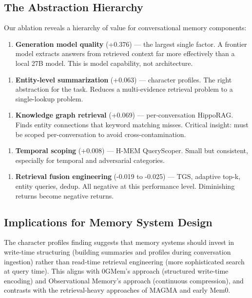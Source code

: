 \documentclass[11pt]{article}
\begin{document}
\subsection{The Abstraction Hierarchy}

Our ablation reveals a hierarchy of value for conversational memory components:


\begin{enumerate}
  \item \textbf{Generation model quality} (+0.376) --- the largest single factor. A frontier model extracts answers from retrieved context far more effectively than a local 27B model. This is model capability, not architecture.
\end{enumerate}


\begin{enumerate}
  \item \textbf{Entity-level summarization} (+0.063) --- character profiles. The right abstraction for the task. Reduces a multi-evidence retrieval problem to a single-lookup problem.
\end{enumerate}


\begin{enumerate}
  \item \textbf{Knowledge graph retrieval} (+0.069) --- per-conversation HippoRAG. Finds entity connections that keyword matching misses. Critical insight: must be scoped per-conversation to avoid cross-contamination.
\end{enumerate}


\begin{enumerate}
  \item \textbf{Temporal scoping} (+0.008) --- H-MEM QueryScoper. Small but consistent, especially for temporal and adversarial categories.
\end{enumerate}


\begin{enumerate}
  \item \textbf{Retrieval fusion engineering} (-0.019 to -0.025) --- TGS, adaptive top-k, entity queries, dedup. All negative at this performance level. Diminishing returns become negative returns.
\end{enumerate}


\subsection{Implications for Memory System Design}

The character profiles finding suggests that memory systems should invest in write-time structuring (building summaries and profiles during conversation ingestion) rather than read-time retrieval engineering (more sophisticated search at query time). This aligns with 0GMem's approach (structured write-time encoding) and Observational Memory's approach (continuous compression), and contrasts with the retrieval-heavy approaches of MAGMA and early Mem0.
\end{document}
